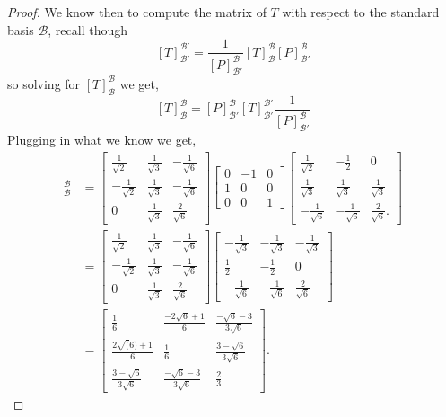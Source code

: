 \documentclass[11pt]{article}
\begin{document}
\begin{proof}
  We know then to compute the matrix of $T$ with respect to the standard basis $\mathcal{B}$, recall though
  \[[T]_{\mathcal{B}'}^{\mathcal{B}'} = \frac{1}{[P]_{\mathcal{B}'}^{\mathcal{B}}} [T]_{\mathcal{B}}^{\mathcal{B}} [P]_{\mathcal{B}'}^{\mathcal{B}}\]
  so solving for $[T]_{\mathcal{B}}^{\mathcal{B}}$ we get,
  \[[T]_{\mathcal{B}}^{\mathcal{B}} = [P]_{\mathcal{B}'}^{\mathcal{B}} [T]_{\mathcal{B}'}^{\mathcal{B}'} \frac{1}{[P]_{\mathcal{B}'}^{\mathcal{B}}}\]
  Plugging in what we know we get,
  \begin{align*}
    [T]_{\mathcal{B}}^{\mathcal{B}} &= \begin{bmatrix}
      \frac{1}{\sqrt{2}} & \frac{1}{\sqrt{3}} & -\frac{1}{\sqrt{6}} \\
      - \frac{1}{\sqrt{2}} & \frac{1}{\sqrt{3}} & -\frac{1}{\sqrt{6}} \\
      0 & \frac{1}{\sqrt{3}} & \frac{2}{\sqrt{6}}
    \end{bmatrix} \begin{bmatrix}
      0 & -1 & 0 \\
      1 & 0 & 0 \\
      0 & 0 & 1
    \end{bmatrix}\begin{bmatrix}
      \frac{1}{\sqrt{2}} & -\frac{1}{2} & 0 \\
      \frac{1}{\sqrt{3}} & \frac{1}{\sqrt{3}} & \frac{1}{\sqrt{3}} \\
      -\frac{1}{\sqrt{6}} & -\frac{1}{\sqrt{6}} & \frac{2}{\sqrt{6}}.
    \end{bmatrix} \\
    &= \begin{bmatrix}
      \frac{1}{\sqrt{2}} & \frac{1}{\sqrt{3}} & -\frac{1}{\sqrt{6}} \\
      - \frac{1}{\sqrt{2}} & \frac{1}{\sqrt{3}} & -\frac{1}{\sqrt{6}} \\
      0 & \frac{1}{\sqrt{3}} & \frac{2}{\sqrt{6}}
    \end{bmatrix} \begin{bmatrix}
      -\frac{1}{\sqrt{3}} & -\frac{1}{\sqrt{3}} & -\frac{1}{\sqrt{3}} \\
      \frac{1}{2} & -\frac{1}{2} & 0 \\
      -\frac{1}{\sqrt{6}} & -\frac{1}{\sqrt{6}} & \frac{2}{\sqrt{6}}
    \end{bmatrix} \\
    &= \begin{bmatrix}
      \frac{1}{6} & \frac{-2\sqrt{6} + 1}{6} & \frac{-\sqrt{6} -3}{3\sqrt{6}} \\
      \frac{2\sqrt(6) + 1}{6} & \frac{1}{6} & \frac{3- \sqrt{6}}{3\sqrt{6}} \\
      \frac{3-\sqrt{6}}{3\sqrt{6}} & \frac{-\sqrt{6} -3}{3\sqrt{6}} &\frac{2}{3}
    \end{bmatrix}.
  \end{align*}
\end{proof}
\end{document}
